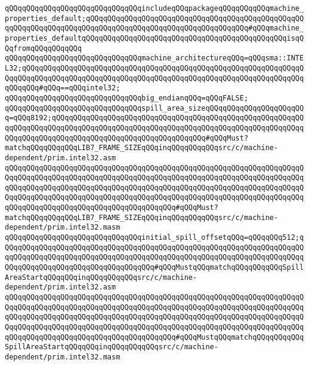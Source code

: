 \verb|qQQqqQQqqQQqqQQqqQQqqQQqqQQqqQQqincludeqQQqpackageqQQqqQQqqQQqmachine_properties_default;qQQqqQQqqQQqqQQqqQQqqQQqqQQqqQQqqQQqqQQqqQQqqQQqqQQqqQQqqQQqqQQqqQQqqQQqqQQqqQQqqQQqqQQqqQQqqQQqqQQqqQQqqQQq#qQQqmachine_properties_defaultqQQqqQQqqQQqqQQqqQQqqQQqqQQqqQQqqQQqqQQqqQQqqQQqisqQQqfromqQQqqQQqqQQq|\newline
\newline
\verb|qQQqqQQqqQQqqQQqqQQqqQQqqQQqqQQqmachine_architectureqQQq=qQQqsma::INTEL32;qQQqqQQqqQQqqQQqqQQqqQQqqQQqqQQqqQQqqQQqqQQqqQQqqQQqqQQqqQQqqQQqqQQqqQQqqQQqqQQqqQQqqQQqqQQqqQQqqQQqqQQqqQQqqQQqqQQqqQQqqQQqqQQqqQQqqQQqqQQqqQQq#qQQq==qQQqintel32;|\newline
\verb|qQQqqQQqqQQqqQQqqQQqqQQqqQQqqQQqbig_endianqQQq=qQQqFALSE;|\newline
\newline
\verb|qQQqqQQqqQQqqQQqqQQqqQQqqQQqqQQqspill_area_sizeqQQqqQQqqQQqqQQqqQQqqQQq=qQQq8192;qQQqqQQqqQQqqQQqqQQqqQQqqQQqqQQqqQQqqQQqqQQqqQQqqQQqqQQqqQQqqQQqqQQqqQQqqQQqqQQqqQQqqQQqqQQqqQQqqQQqqQQqqQQqqQQqqQQqqQQqqQQqqQQqqQQqqQQqqQQqqQQqqQQqqQQqqQQqqQQqqQQqqQQqqQQqqQQq#qQQqMust?matchqQQqqQQqqQQqLIB7_FRAME_SIZEqQQqinqQQqqQQqqQQqsrc/c/machine-dependent/prim.intel32.asm|\newline
\verb|qQQqqQQqqQQqqQQqqQQqqQQqqQQqqQQqqQQqqQQqqQQqqQQqqQQqqQQqqQQqqQQqqQQqqQQqqQQqqQQqqQQqqQQqqQQqqQQqqQQqqQQqqQQqqQQqqQQqqQQqqQQqqQQqqQQqqQQqqQQqqQQqqQQqqQQqqQQqqQQqqQQqqQQqqQQqqQQqqQQqqQQqqQQqqQQqqQQqqQQqqQQqqQQqqQQqqQQqqQQqqQQqqQQqqQQqqQQqqQQqqQQqqQQqqQQqqQQqqQQqqQQqqQQqqQQqqQQqqQQqqQQqqQQqqQQqqQQqqQQqqQQqqQQqqQQqqQQqqQQq#qQQqMust?matchqQQqqQQqqQQqLIB7_FRAME_SIZEqQQqinqQQqqQQqqQQqsrc/c/machine-dependent/prim.intel32.masm|\newline
\newline
\verb|qQQqqQQqqQQqqQQqqQQqqQQqqQQqqQQqinitial_spill_offsetqQQq=qQQqqQQq512;qQQqqQQqqQQqqQQqqQQqqQQqqQQqqQQqqQQqqQQqqQQqqQQqqQQqqQQqqQQqqQQqqQQqqQQqqQQqqQQqqQQqqQQqqQQqqQQqqQQqqQQqqQQqqQQqqQQqqQQqqQQqqQQqqQQqqQQqqQQqqQQqqQQqqQQqqQQqqQQqqQQqqQQqqQQqqQQq#qQQqMustqQQqmatchqQQqqQQqqQQqSpillAreaStartqQQqqQQqinqQQqqQQqqQQqsrc/c/machine-dependent/prim.intel32.asm|\newline
\verb|qQQqqQQqqQQqqQQqqQQqqQQqqQQqqQQqqQQqqQQqqQQqqQQqqQQqqQQqqQQqqQQqqQQqqQQqqQQqqQQqqQQqqQQqqQQqqQQqqQQqqQQqqQQqqQQqqQQqqQQqqQQqqQQqqQQqqQQqqQQqqQQqqQQqqQQqqQQqqQQqqQQqqQQqqQQqqQQqqQQqqQQqqQQqqQQqqQQqqQQqqQQqqQQqqQQqqQQqqQQqqQQqqQQqqQQqqQQqqQQqqQQqqQQqqQQqqQQqqQQqqQQqqQQqqQQqqQQqqQQqqQQqqQQqqQQqqQQqqQQqqQQqqQQqqQQqqQQqqQQq#qQQqMustqQQqmatchqQQqqQQqqQQqSpillAreaStartqQQqqQQqinqQQqqQQqqQQqsrc/c/machine-dependent/prim.intel32.masm|\newline
